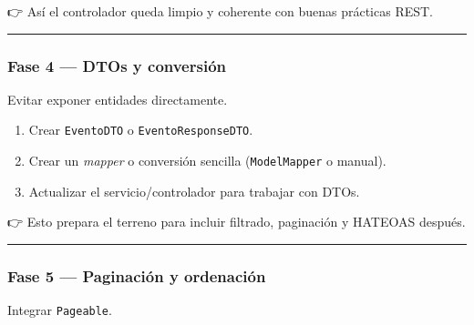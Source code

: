 \documentclass[
]{article}
\providecommand{\tightlist}{%
  \setlength{\itemsep}{0pt}\setlength{\parskip}{0pt}}
\begin{document}
👉 Así el controlador queda limpio y coherente con buenas prácticas
REST.

\begin{center}\rule{0.5\linewidth}{0.5pt}\end{center}

\subsubsection{\texorpdfstring{\textbf{Fase 4 --- DTOs y
conversión}}{Fase 4 --- DTOs y conversión}}\label{fase-4-dtos-y-conversiuxf3n}

Evitar exponer entidades directamente.

\begin{enumerate}
\def\labelenumi{\arabic{enumi}.}
\tightlist
\item
  Crear \texttt{EventoDTO} o \texttt{EventoResponseDTO}.
\item
  Crear un \emph{mapper} o conversión sencilla (\texttt{ModelMapper} o
  manual).
\item
  Actualizar el servicio/controlador para trabajar con DTOs.
\end{enumerate}

👉 Esto prepara el terreno para incluir filtrado, paginación y HATEOAS
después.

\begin{center}\rule{0.5\linewidth}{0.5pt}\end{center}

\subsubsection{\texorpdfstring{\textbf{Fase 5 --- Paginación y
ordenación}}{Fase 5 --- Paginación y ordenación}}\label{fase-5-paginaciuxf3n-y-ordenaciuxf3n}

Integrar \texttt{Pageable}.
\end{document}
